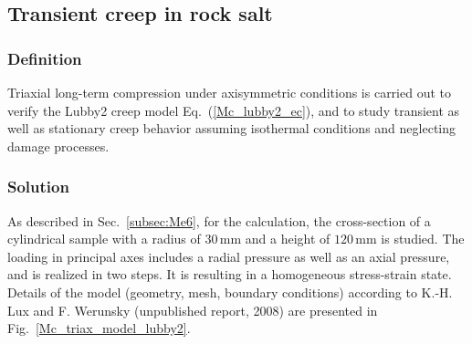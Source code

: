\subsection{Transient creep in rock salt}
\label{subsec:Mc4}

\subsubsection{Definition}
\label{subsubsec:Mc4_def}

Triaxial long-term compression under axisymmetric conditions is carried out to verify the Lubby2 creep model Eq.~(\ref{Mc_lubby2_ec}), and to study transient as well as stationary creep behavior assuming isothermal conditions and neglecting damage processes.

\subsubsection{Solution}
\label{subsubsec:Mc4_sol}

As described in Sec.~\ref{subsec:Me6}, for the calculation, the cross-section of a cylindrical sample with a radius of $30\,$mm and a height of $120\,$mm is studied. The loading in principal axes includes a radial pressure as well as an axial pressure, and is realized in two steps. It is resulting in a homogeneous stress-strain state. Details of the model (geometry, mesh, boundary conditions) according to K.-H. Lux and F. Werunsky (unpublished report, 2008) are presented in Fig.~\ref{Mc_triax_model_lubby2}.

